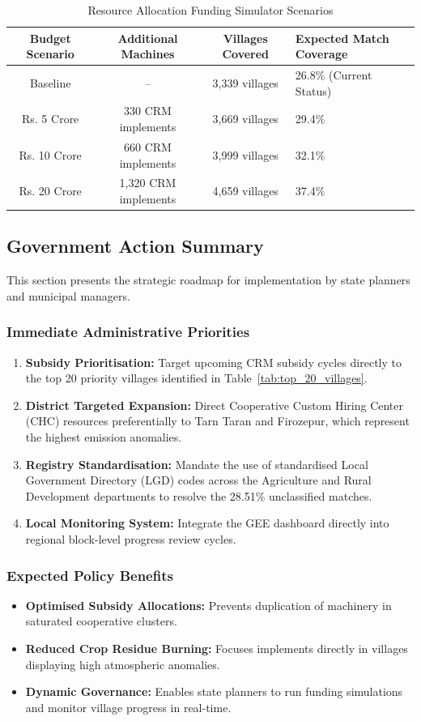 \documentclass[12pt,a4paper]{report}
\begin{document}
\begin{table}[H]
\centering
\caption{Resource Allocation Funding Simulator Scenarios}
\label{tab:budget_simulator}
\begin{tabular}{cccl}
\toprule
\textbf{Budget Scenario} & \textbf{Additional Machines} & \textbf{Villages Covered} & \textbf{Expected Match Coverage} \\
\midrule
Baseline & -- & 3,339 villages & 26.8\% (Current Status) \\
Rs. 5 Crore & 330 CRM implements & 3,669 villages & 29.4\% \\
Rs. 10 Crore & 660 CRM implements & 3,999 villages & 32.1\% \\
Rs. 20 Crore & 1,320 CRM implements & 4,659 villages & 37.4\% \\
\bottomrule
\end{tabular}
\end{table}\subsection{Government Action Summary}
This section presents the strategic roadmap for implementation by state planners and municipal managers.

\subsubsection*{Immediate Administrative Priorities}
\begin{enumerate}
    \item \textbf{Subsidy Prioritisation:} Target upcoming CRM subsidy cycles directly to the top 20 priority villages identified in Table~\ref{tab:top_20_villages}.
    \item \textbf{District Targeted Expansion:} Direct Cooperative Custom Hiring Center (CHC) resources preferentially to Tarn Taran and Firozepur, which represent the highest emission anomalies.
    \item \textbf{Registry Standardisation:} Mandate the use of standardised Local Government Directory (LGD) codes across the Agriculture and Rural Development departments to resolve the 28.51\% unclassified matches.
    \item \textbf{Local Monitoring System:} Integrate the GEE dashboard directly into regional block-level progress review cycles.
\end{enumerate}

\subsubsection*{Expected Policy Benefits}
\begin{itemize}
    \item \textbf{Optimised Subsidy Allocations:} Prevents duplication of machinery in saturated cooperative clusters.
    \item \textbf{Reduced Crop Residue Burning:} Focuses implements directly in villages displaying high atmospheric anomalies.
    \item \textbf{Dynamic Governance:} Enables state planners to run funding simulations and monitor village progress in real-time.
\end{itemize}
\end{document}
